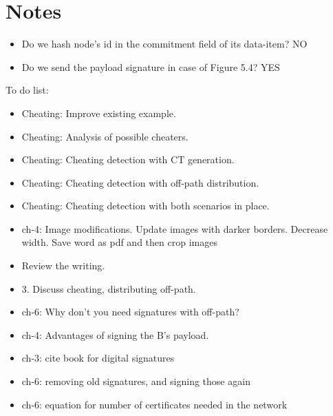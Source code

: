 \chapter{Notes}

\begin{itemize}
	\item Do we hash node's id in the commitment field of its data-item? NO
	\item Do we send the payload signature in case of Figure 5.4? YES
\end{itemize}

To do list:
\begin{itemize}
	\item Cheating: Improve existing example.
	\item Cheating: Analysis of possible cheaters.
	\item Cheating: Cheating detection with CT generation.
	\item Cheating: Cheating detection with off-path distribution.
	\item Cheating: Cheating detection with both scenarios in place.

	\item ch-4: Image modifications. Update images with darker borders. Decrease width. Save word as pdf and then crop images
	\item Review the writing.

	\item 3. Discuss cheating, distributing off-path.  
	\item ch-6: Why don't you need signatures with off-path?
	\item ch-4: Advantages of signing the B's payload.

	\item ch-3: cite book for digital signatures

	\item ch-6: removing old signatures, and signing those again
	\item ch-6: equation for number of certificates needed in the network

\end{itemize}